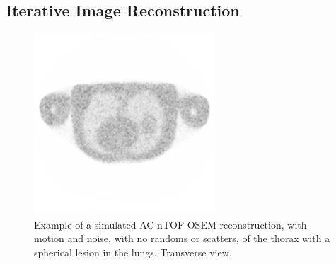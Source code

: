             
            
        \subsection{Iterative Image Reconstruction} \label{sec:iterative_image_reconstruction}
            \begin{figure}
                \centering
                
                \includegraphics[width=1.0\linewidth]{figures/background_osem_example.png}
                
                \captionsetup{singlelinecheck=false, justification=raggedright}
                \caption{Example of a simulated \gls{AC} \gls{nTOF} \gls{OSEM} reconstruction, with motion and noise, with no randoms or scatters, of the thorax with a spherical lesion in the lungs. Transverse view.}
                \label{fig:iterative_image_reconstruction_osem_example}
            \end{figure}
            
